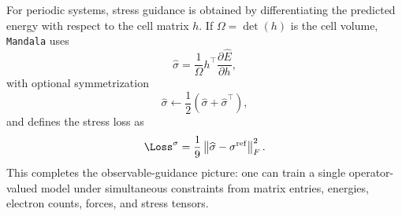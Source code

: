For periodic systems, stress guidance is obtained by differentiating the
predicted energy with respect to the cell matrix $h$. If
$\Omega = \det(h)$ is the cell volume, \texttt{Mandala} uses
\begin{equation}
\widehat{\sigma}
=
\frac{1}{\Omega} h^{\top}
\frac{\partial \widehat{E}}{\partial h},
\end{equation}
with optional symmetrization
\begin{equation}
\widehat{\sigma}
\leftarrow
\frac{1}{2}\left(\widehat{\sigma}+\widehat{\sigma}^{\top}\right),
\end{equation}
and defines the stress loss as
\begin{equation}
\Loss^{\sigma}
=
\frac{1}{9}
\left\|
\widehat{\sigma} - \sigma^{\mathrm{ref}}
\right\|_F^2.
\end{equation}
This completes the observable-guidance picture: one can train a single
operator-valued model under simultaneous constraints from matrix entries,
energies, electron counts, forces, and stress tensors.
